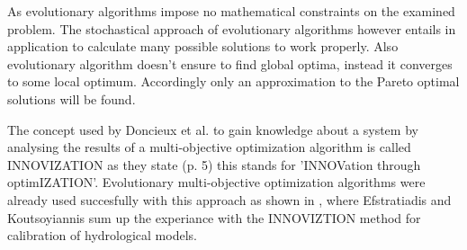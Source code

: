 \documentclass[12pt,twoside]{article}
\theoremstyle{plain}
\theoremstyle{definition}
\theoremstyle{remark}
\begin{document}
As evolutionary algorithms impose no mathematical constraints on the examined problem. The stochastical approach of evolutionary algorithms however entails in application to calculate many possible solutions to work properly. Also evolutionary algorithm doesn't ensure to find global optima, instead it converges to some local optimum. Accordingly only an approximation to the Pareto optimal solutions will be found.

The concept used by Doncieux et al. to gain knowledge about a system by analysing the results of a multi-objective optimization algorithm is called INNOVIZATION as they state \cite{doncieux2015multi} (p. 5) this stands for 'INNOVation through optimIZATION'.
Evolutionary multi-objective optimization algorithms were already used succesfully with this approach as shown in \cite{efstratiadis2010one}, where Efstratiadis and Koutsoyiannis sum up the experiance with the INNOVIZTION method for calibration of hydrological models.
\end{document}
